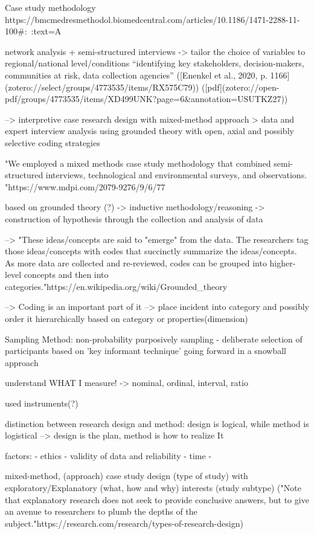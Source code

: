 Case study methodology
https://bmcmedresmethodol.biomedcentral.com/articles/10.1186/1471-2288-11-100#:~:text=A%

network analysis + semi-structured interviews -> tailor the choice of variables to regional/national level/conditions “identifying key stakeholders, decision-makers, communities at risk, data collection agencies” ([Enenkel et al., 2020, p. 1166](zotero://select/groups/4773535/items/RX575C79)) ([pdf](zotero://open-pdf/groups/4773535/items/XD499UNK?page=6&annotation=USUTKZ27))



--> interpretive case research design with mixed-method approach > data and expert interview analysis using grounded theory with open, axial and possibly selective coding strategies

"We employed a mixed methods case study methodology that combined semi-structured interviews, technological and environmental surveys, and observations. "https://www.mdpi.com/2079-9276/9/6/77


based on grounded theory (?) -> inductive methodology/reasoning -> construction of hypothesis through the collection and analysis of data


--> "These ideas/concepts are said to "emerge" from the data. The researchers tag those ideas/concepts with codes that succinctly summarize the ideas/concepts. As more data are collected and re-reviewed, codes can be grouped into higher-level concepts and then into categories."https://en.wikipedia.org/wiki/Grounded_theory

--> Coding is an important part of it --> place incident into category and possibly order it hierarchically based on category or properties(dimension)

Sampling Method:
non-probability purposively sampling - deliberate selection of participants based on 'key informant technique' going forward in a snowball approach

understand WHAT I measure!
-> nominal, ordinal, interval, ratio

used instruments(?)


distinction between research design and method:
design is logical, while method is logistical
--> design is the plan, method is how to realize It

factors:
- ethics
- validity of data and reliability
- time
- 

mixed-method, (approach)
case study design (type of study) with 
exploratory/Explanatory (what, how and why) interests (study subtype) ("Note that explanatory research does not seek to provide conclusive answers, but to give an avenue to researchers to plumb the depths of the subject."https://research.com/research/types-of-research-design)

